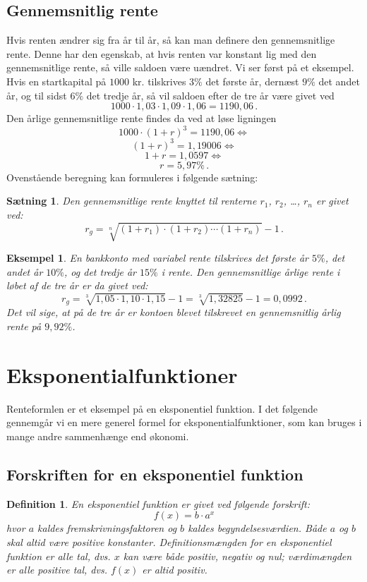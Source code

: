 \documentclass[12pt,oneside,a4paper]{article}
\theoremstyle{plain}
\newtheorem*{thm}{Sætning}
\newtheorem*{mydef}{Definition}
\newtheorem*{eks}{Eksempel}
\begin{document}
\subsection*{Gennemsnitlig rente}
Hvis renten ændrer sig fra år til år, så kan man definere den gennemsnitlige
rente. Denne har den egenskab, at hvis renten var konstant lig med den
gennemsnitlige rente, så ville saldoen være uændret.  Vi ser først på et
eksempel. Hvis en startkapital på $1000$ kr. tilskrives $3\%$ det første år,
dernæst $9\%$ det andet år, og til sidst $6\%$ det tredje år, så vil saldoen
efter de tre år være givet ved
\[
    1000\cdot 1,03 \cdot 1,09 \cdot 1,06 = 1190,06\,.
\]
Den årlige gennemsnitlige rente findes da ved at løse ligningen
\[
    1000\cdot (1+r)^3 = 1190,06 \Leftrightarrow 
\]
\[
    (1+r)^3=1,19006 \Leftrightarrow
\]
\[
    1+r = 1,0597 \Leftrightarrow
\]
\[
    r = 5,97\%\,.
\]
Ovenstående beregning kan formuleres i følgende sætning:
\begin{thm}
    Den gennemsnitlige rente knyttet til renterne $r_1$, $r_2$, \ldots, $r_n$
    er givet ved:
    \[
        r_g = \sqrt[n]{(1+r_1)\cdot(1+r_2)\cdots(1+r_n)}-1 \,.
    \]
\end{thm}
\begin{eks}
    En bankkonto med variabel rente tilskrives det første år $5\%$, det andet
    år $10\%$, og det tredje år $15\%$ i rente. Den gennemsnitlige årlige rente
    i løbet af de tre år er da givet ved:
    \[
        r_g = \sqrt[3]{1,05\cdot1,10\cdot1,15}-1 = \sqrt[3]{1,32825}-1 = 0,0992\,.
    \]
Det vil sige, at på de tre år er kontoen blevet tilskrevet en gennemsnitlig
    årlig rente på $9,92\%$.
\end{eks}

\section*{Eksponentialfunktioner}
Renteformlen er et eksempel på en eksponentiel funktion. I det følgende
gennemgår vi en mere generel formel for eksponentialfunktioner, som kan
bruges i mange andre sammenhænge end økonomi.

\subsection*{Forskriften for en eksponentiel funktion}
\begin{mydef}
    En eksponentiel funktion er givet ved følgende forskrift:
    $$
    f(x) = b\cdot a^x
    $$
    hvor $a$ kaldes {\em fremskrivningsfaktoren} og $b$ kaldes {\em
    begyndelsesværdien}. Både $a$ og $b$ skal altid være positive konstanter.
    Definitionsmængden for en eksponentiel funktion er alle tal, dvs. $x$ kan
    være både positiv, negativ og nul; værdimængden er alle positive tal, dvs.
    $f(x)$ er altid positiv.
\end{mydef}
\end{document}
